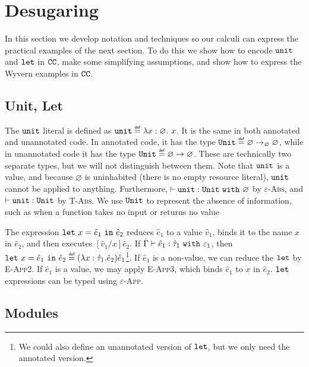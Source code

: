 \section{Desugaring}

In this section we develop notation and techniques so our calculi can express the practical examples of the next section. To do this we show how to encode $\mathtt{unit}$ and $\mathtt{let}$ in $\mathtt{CC}$, make some simplifying assumptions, and show how to express the Wyvern examples in $\mathtt{CC}$.

\subsection{Unit, Let}

The $\mathtt{unit}$ literal is defined as $\unit \defn \lambda x: \varnothing.~x$. It is the same in both annotated and unannotated code. In annotated code, it has the type $\Unit \defn \varnothing \rightarrow_{\varnothing} \varnothing$, while in unannotated code it has the type $\Unit \defn \varnothing \rightarrow \varnothing$. These are technically two separate types, but we will not distinguish between them. Note that $\mathtt{unit}$ is a value, and because $\varnothing$ is uninhabited (there is no empty resource literal), $\mathtt{unit}$ cannot be applied to anything. Furthermore, $\vdash \mathtt{unit}: \mathtt{Unit}~\mathtt{with}~ \varnothing$ by \textsc{$\varepsilon$-Abs}, and $\vdash \mathtt{unit}: \mathtt{Unit}$ by \textsc{T-Abs}. We use $\mathtt{Unit}$ to represent the absence of information, such as when a function takes no input or returns no value

The expression $\mathtt{let}~ x = \hat e_1~\mathtt{in}~ \hat e_2$ reduces $\hat e_1$ to a value $\hat v_1$, binds it to the name $x$ in $\hat e_2$, and then executes $[\hat v_1/x]\hat e_2$. If $\hat \Gamma \vdash \hat e_1: \hat \tau_1~\mathtt{with}~ \varepsilon_1$, then $\letxpr{x}{\hat e_1}{\hat e_2} \defn (\lambda x: \hat \tau_1 . \hat e_2) \hat e_1$\footnote{We could also define an unannotated version of $\mathtt{let}$, but we only need the annotated version.}. If $\hat e_1$ is a non-value, we can reduce the $\mathtt{let}$ by \textsc{E-App2}. If $\hat e_1$ is a value, we may apply \textsc{E-App3}, which binds $\hat e_1$ to $x$ in $\hat e_2$. $\mathtt{let}$ expressions can be typed using \textsc{$\varepsilon$-App}.

\subsection{Modules}

